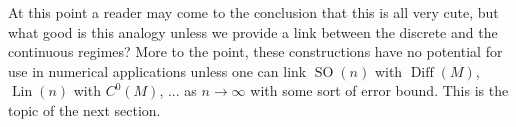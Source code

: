 \documentclass[12pt]{amsart}
\newcommand{\R}{\ensuremath{\mathbb{R}}}
\DeclareMathOperator{\Diff}{Diff}
\DeclareMathOperator{\Dens}{Dens}
\DeclareMathOperator{\SO}{SO}
\DeclareMathOperator{\Lin}{Lin}
\DeclareMathOperator{\Conj}{Conj}
\begin{document}
At this point a reader may come to the conclusion that this is all very cute, but
what good is this analogy unless we provide a link between the discrete and the continuous regimes?
More to the point, these constructions have no potential for use in numerical applications unless one can link
$\SO(n)$ with $\Diff(M)$, $\Lin(n)$ with $C^0(M)$, ... as $n \to \infty$ with some sort of error bound.
This is the topic of the next section.

%
\end{document}
